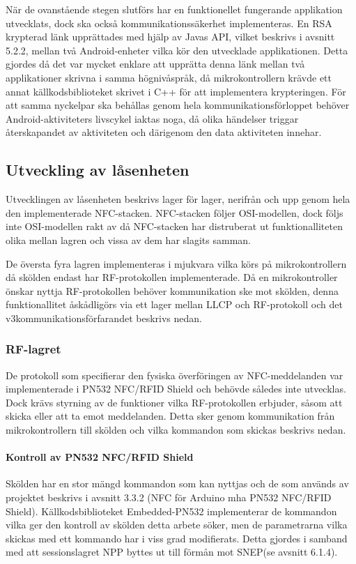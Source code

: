 \documentclass[11pt]{article}
\begin{document}
När de ovanstående stegen slutförs har en funktionellet fungerande applikation utvecklats, dock ska också kommunikationssäkerhet implementeras. En RSA krypterad länk upprättades med hjälp av Javas API, vilket beskrivs i avsnitt 5.2.2, mellan två Android-enheter vilka kör den utvecklade applikationen. Detta gjordes då det var mycket enklare att upprätta denna länk mellan två applikationer skrivna i samma högnivåspråk, då mikrokontrollern krävde ett annat källkodsbiblioteket skrivet i C++ för att implementera krypteringen. För att samma nyckelpar ska behållas genom hela kommunikationsförloppet behöver Android-aktiviteters livscykel iaktas noga, då olika händelser triggar återskapandet av aktiviteten och därigenom den data aktiviteten innehar.

\subsection{Utveckling av låsenheten}
Utvecklingen av låsenheten beskrivs lager för lager, nerifrån och upp genom hela den implementerade NFC-stacken. NFC-stacken följer OSI-modellen, dock följs inte OSI-modellen rakt av då NFC-stacken har  distruberat ut funktionalliteten olika mellan lagren och vissa av dem har slagits samman. 


De översta fyra lagren implementeras i mjukvara vilka körs på mikrokontrollern då skölden endast har RF-protokollen implementerade. Då en mikrokontroller önskar nyttja RF-protokollen behöver kommunikation ske mot skölden, denna funktionallitet åskådligörs via ett lager mellan LLCP och RF-protokoll och det  v3kommunikationsförfarandet beskrivs nedan.

\subsubsection{RF-lagret}
De protokoll som specifierar den fysiska överföringen av NFC-meddelanden var implementerade i PN532 NFC/RFID Shield och behövde således inte utvecklas. Dock krävs styrning av de funktioner vilka RF-protokollen erbjuder, såsom att skicka eller att ta emot meddelanden. Detta sker genom kommunikation från mikrokontrollern till skölden och vilka kommandon som skickas beskrivs nedan.

\paragraph{Kontroll av PN532 NFC/RFID Shield}
Skölden har en stor mängd kommandon som kan nyttjas och de som används av projektet beskrivs i avsnitt 3.3.2 (NFC för Arduino mha PN532 NFC/RFID Shield). Källkodsbiblioteket Embedded-PN532 implementerar de kommandon vilka ger den kontroll av skölden detta arbete söker, men de parametrarna vilka skickas med ett kommando har i viss grad modifierats. Detta gjordes i samband med att sessionslagret NPP byttes ut till förmån mot SNEP(se avsnitt 6.1.4).
\end{document}
